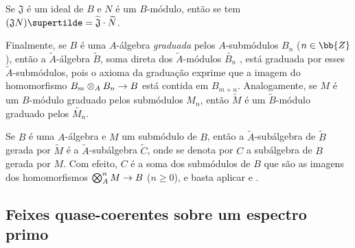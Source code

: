 \documentclass[oneside]{amsart}
\makeatletter
\renewcommand{\geq}{\geqslant}
\newcommand{\ega@arrow}[2]{\mathchoice{#1}{#2}{#2}{#2}}
\renewcommand{\to}{\ega@arrow{\longrightarrow}{\rightarrow}}
\let\EGAOriginalLabel\label
\renewcommand{\label}[1]{\phantomsection\EGAOriginalLabel{#1}}
\makeatother
\begin{document}
\begin{env}[1.3.13]
Se $\mathfrak{J}$ é um ideal de $B$ e $N$ é um $B$-módulo, então se tem $(\mathfrak{J}N)\supertilde=\widetilde{\mathfrak{J}}\cdot\widetilde{N}$.

Finalmente, se $B$ é uma $A$-álgebra \emph{graduada} pelos $A$-submódulos $B_n$ ($n\in\bb{Z}$), então a $\widetilde{A}$-álgebra $\widetilde{B}$, soma direta dos $\widetilde{A}$-módulos $\widetilde{B_n}$ , está graduada por esses $\widetilde{A}$-submódulos, pois o axioma da graduação exprime que a imagem do homomorfismo $B_m\otimes_A B_n\to B$ está contida em $B_{m+n}$.
Analogamente, se $M$ é um $B$-módulo graduado pelos submódulos $M_n$, então $\widetilde{M}$ é um $\widetilde{B}$-módulo graduado pelos $\widetilde{M_n}$.
\end{env}

\begin{env}[1.3.14]
\label{I.1.3.14}
Se $B$ é uma $A$-álgebra e $M$ um submódulo de $B$, então a $\widetilde{A}$-subálgebra de $\widetilde{B}$ gerada por $\widetilde{M}$  é a $\widetilde{A}$-subálgebra $\widetilde{C}$, onde se denota por $C$ a subálgebra de $B$ gerada por $M$.
Com efeito, $C$ é a soma dos submódulos de $B$ que são as imagens dos homomorfismos $\bigotimes_A^n M\to B$ ($n\geq 0$), e basta aplicar  e .
\end{env}

\subsection{Feixes quase-coerentes sobre um espectro primo}
\label{subsection:I.1.4}
\end{document}

